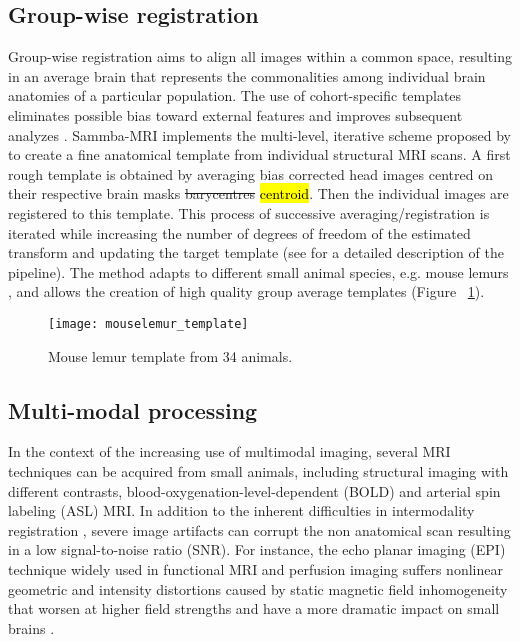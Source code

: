 \documentclass[utf8, a4paper, final, crop]{frontiersSCNS}
\begin{document}
\subsection{Group-wise registration}
Group-wise registration aims to align all images within a common
space, resulting in an average brain that represents the commonalities among
individual brain anatomies of a particular population.
The use of cohort-specific templates eliminates possible bias toward external
features and improves subsequent analyzes \citep{de2019towards}.
Sammba-MRI implements the multi-level, iterative scheme proposed by \citep{kovavcevic2005three}
to create a fine anatomical 
template from individual structural MRI scans. A first rough template is obtained
by averaging bias corrected head images centred on their respective brain masks \st{barycentres} \hl{centroid}. Then the individual images are registered to this template.
This process of successive averaging/registration is iterated while increasing the number of degrees of 
freedom of the estimated transform and updating the target template (see \citep{nadkarni20193d} for a detailed description of the pipeline).
The method adapts to different small animal species, e.g. mouse lemurs
\citep{nadkarni2018digital}, and allows the creation of high quality
group average templates (Figure ~\ref{fig:mouse_template}).
\begin{figure}[h!]
\begin{center}
\texttt{[image: mouselemur\_template]}
\end{center}
\caption{Mouse lemur template from 34 animals.}\label{fig:mouse_template}
\end{figure}

\subsection{Multi-modal processing}
In the context of the increasing use of multimodal imaging, several
MRI techniques can 
be acquired from small animals, including
structural imaging with different contrasts, 
blood-oxygenation-level-dependent (BOLD) and  arterial spin labeling (ASL) MRI.
In addition to the inherent difficulties in intermodality registration \citep{ashburner1997multimodal},
severe image artifacts can corrupt the non anatomical scan
resulting in a low signal-to-noise ratio (SNR).
For instance, the echo 
planar imaging (EPI) 
technique widely used in  
functional MRI and perfusion imaging
suffers nonlinear geometric and intensity distortions caused by static magnetic field 
inhomogeneity that 
worsen at higher field strengths and have a more dramatic impact on small brains
\citep{hong2015evaluation}. 
\end{document}
